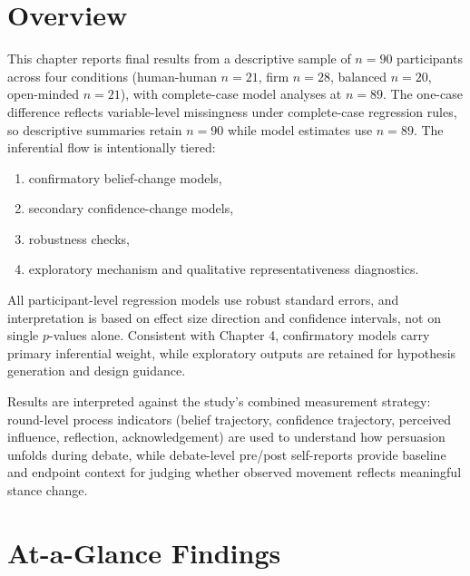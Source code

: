 
\section{Overview}

This chapter reports final results from a descriptive sample of $n=90$ participants across four conditions
(human-human $n=21$, firm $n=28$, balanced $n=20$, open-minded $n=21$), with complete-case model analyses at $n=89$.
The one-case difference reflects variable-level missingness under complete-case regression rules,
so descriptive summaries retain $n=90$ while model estimates use $n=89$.
The inferential flow is intentionally tiered:
\begin{enumerate}
    \item confirmatory belief-change models,
    \item secondary confidence-change models,
    \item robustness checks,
    \item exploratory mechanism and qualitative representativeness diagnostics.
\end{enumerate}

All participant-level regression models use robust standard errors, and interpretation
is based on effect size direction and confidence intervals, not on single $p$-values alone.
Consistent with Chapter 4, confirmatory models carry primary inferential weight,
while exploratory outputs are retained for hypothesis generation and design guidance.

Results are interpreted against the study's combined measurement strategy: round-level
process indicators (belief trajectory, confidence trajectory, perceived influence,
reflection, acknowledgement) are used to understand how persuasion unfolds during
debate, while debate-level pre/post self-reports provide baseline and endpoint
context for judging whether observed movement reflects meaningful stance change.

\pagebreak
\section{At-a-Glance Findings}

